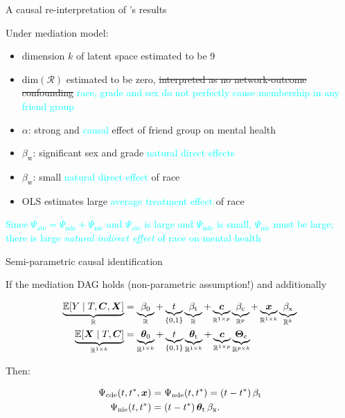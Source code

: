 \documentclass{beamer}
\theoremstyle{remark}
\renewcommand{\c}{\bm c}
\newcommand{\x}{\bm x}
\newcommand{\C}{\bm C}
\newcommand{\X}{\bm X}
\newcommand{\thetazero}{\bm \theta_0}
\newcommand{\thetat}{\bm \theta_\text{t}}
\newcommand{\Thetac}{\bm \Theta_\text{c}}
\newcommand{\betazero}{\beta_0}
\newcommand{\betat}{\beta_\text{t}}
\newcommand{\betac}{\beta_\text{c}}
\newcommand{\betax}{\beta_\text{x}}
\newcommand{\cde}{\Psi_\text{cde} \paren*{t, t^*, \x}}
\newcommand{\nde}{\Psi_\text{nde} \paren*{t, t^*}}
\newcommand{\nie}{\Psi_\text{nie} \paren*{t, t^*}}
\DeclarePairedDelimiter{\paren}{(}{)}
\DeclarePairedDelimiter{\brac}{[}{]}
\newcommand{\E}[2][]{%
   \ifthenelse{ \equal{#1}{} }
      {\ensuremath{\mathbb{E} \brac*{#2}}}
      {\ensuremath{\mathbb{E} \brac*{#2 \mid #1}}}
}
\begin{document}
\begin{frame}{A causal re-interpretation of \cite{le_linear_2021}'s results}

    Under mediation model:

    \begin{itemize}
        \item dimension $k$ of latent space estimated to be 9
        \item $\mathrm{dim}(\mathcal R)$ estimated to be zero, \sout{interpreted as no network-outcome confounding} \textcolor{cyan}{race, grade and sex do not perfectly cause membership in any friend group}
        \item $\alpha$: strong and \textcolor{cyan}{causal} effect of friend group on mental health
        \item $\beta_\text{w}$: significant sex and grade \textcolor{cyan}{natural direct effects}
        \item $\beta_\text{w}$: small \textcolor{cyan}{natural direct effect} of race
        \item OLS estimates large \textcolor{cyan}{average treatment effect} of race
    \end{itemize}

    \textcolor{cyan}{Since $\Psi_\text{ate} = \Psi_\text{nde} + \Psi_\text{nie}$ and $\Psi_\text{ate}$ is large and $\Psi_\text{nde}$ is small, $\Psi_\text{nie}$ must be large; there is large \emph{natural indirect effect} of race on mental health}

\end{frame}

\begin{frame}{Semi-parametric causal identification}

    If the mediation DAG holds (non-parametric assumption!) and additionally

    \begin{align*}
        \underbrace{\E[T, \C, \X]{Y}}_{\mathbb R}
         & = \underbrace{\betazero}_{\mathbb R}
        + \underbrace{t}_{\{0, 1\}} \underbrace{\betat}_{\mathbb R}
        + \underbrace{\c}_{\mathbb R^{1 \times p}} \underbrace{\betac}_{\mathbb R^p}
        + \underbrace{\x}_{\mathbb R^{1 \times k}} \underbrace{\betax}_{\mathbb R^k} \\
        \underbrace{\E[T, \C]{\X}}_{\mathbb R^{1 \times k}}
         & = \underbrace{\thetazero}_{\mathbb R^{1 \times k}}
        + \underbrace{t}_{\{0, 1\}} \underbrace{\thetat}_{\mathbb R^{1 \times k}}
        + \underbrace{\c}_{\mathbb R^{1 \times p}} \underbrace{\Thetac}_{\mathbb R^{p \times k}}
    \end{align*}

    Then:

    \begin{align*}
        \cde & = \nde = \paren*{t - t^*} \, \betat      \\
        \nie & = \paren*{t - t^*} \, \thetat \, \betax.
    \end{align*}

\end{frame}
\end{document}

